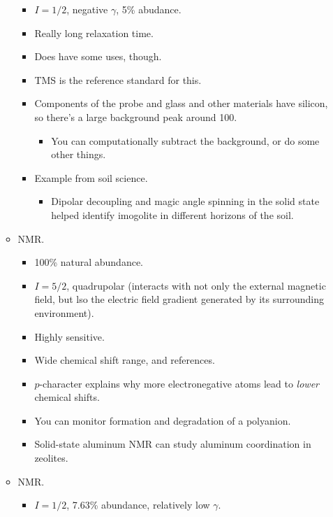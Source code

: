 \documentclass[../notes.tex]{subfiles}
\begin{document}
\begin{itemize}
\begin{itemize}
        \begin{itemize}
            \item $I=1/2$, negative $\gamma$, 5\% abudance.
            \item Really long relaxation time.
            \item Does have some uses, though.
            \item TMS is the reference standard for this.
            \item Components of the probe and glass and other materials have silicon, so there's a large background peak around \SI{100}{\partspermillion}.
            \begin{itemize}
                \item You can computationally subtract the background, or do some other things.
            \end{itemize}
            \item Example from soil science.
            \begin{itemize}
                \item Dipolar decoupling and magic angle spinning in the solid state helped identify imogolite in different horizons of the soil.
            \end{itemize}
        \end{itemize}
        \item {} NMR.
        \begin{itemize}
            \item 100\% natural abundance.
            \item $I=5/2$, quadrupolar (interacts with not only the external magnetic field, but lso the electric field gradient generated by its surrounding environment).
            \item Highly sensitive.
            \item Wide chemical shift range, and references.
            \item $p$-character explains why more electronegative atoms lead to \emph{lower} chemical shifts.
            \item You can monitor formation and degradation of a polyanion.
            \item Solid-state aluminum NMR can study aluminum coordination in zeolites.
        \end{itemize}
        \item {} NMR.
        \begin{itemize}
            \item $I=1/2$, 7.63\% abundance, relatively low $\gamma$.

\end{itemize}
\end{itemize}
\end{itemize}
\end{document}

